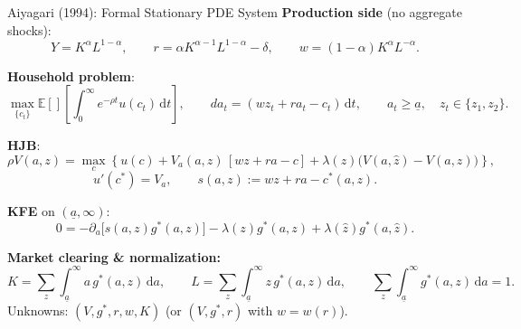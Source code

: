 \documentclass[aspectratio=169,11pt]{beamer}
\newcommand{\E}[1]{\mathbb{E}\!\left[#1\right]}
\newcommand{\ud}{\,\mathrm{d}}
\newcommand{\ubar}[1]{\underline{#1}}
\begin{document}
\begin{frame}{Aiyagari (1994): Formal Stationary PDE System}
\footnotesize
\textbf{Production side} (no aggregate shocks):
\[
Y=K^\alpha L^{1-\alpha},\qquad
r=\alpha K^{\alpha-1}L^{1-\alpha}-\delta,\qquad
w=(1-\alpha)K^\alpha L^{-\alpha}.
\]

\vspace{0.1em}
\textbf{Household problem}:
\[
\max_{\{c_t\}} \E{}\!\left[\int_0^\infty e^{-\rho t}u(c_t)\ud t\right],\qquad
da_t=(w z_t+r a_t-c_t)\ud t,\qquad a_t\ge \ubar a,\quad z_t\in\{z_1,z_2\}.
\]

\vspace{0.1em}
\textbf{HJB}:
\[
\rho V(a,z)=\max_c\left\{u(c)+V_a(a,z)\,[w z+r a-c]+\lambda(z)\big(V(a,\hat z)-V(a,z)\big)\right\},
\]
\[
u'(c^*)=V_a,\qquad s(a,z):=w z+r a-c^*(a,z).
\]

\vspace{0.1em}
\textbf{KFE} on $(\ubar a,\infty)$:
\[
0=-\partial_a\!\big[s(a,z)g^*(a,z)\big]-\lambda(z)g^*(a,z)+\lambda(\hat z)g^*(a,\hat z).
\]

\vspace{0.1em}
\textbf{Market clearing \& normalization:}
\[
K=\sum_{z}\int_{\ubar a}^{\infty} a\,g^*(a,z)\ud a,\qquad
L=\sum_{z}\int_{\ubar a}^{\infty} z\,g^*(a,z)\ud a,\qquad
\sum_{z}\int_{\ubar a}^{\infty} g^*(a,z)\ud a=1.
\]
Unknowns: $(V,g^*,r,w,K)$ (or $(V,g^*,r)$ with $w=w(r)$).
\end{frame}
\end{document}
